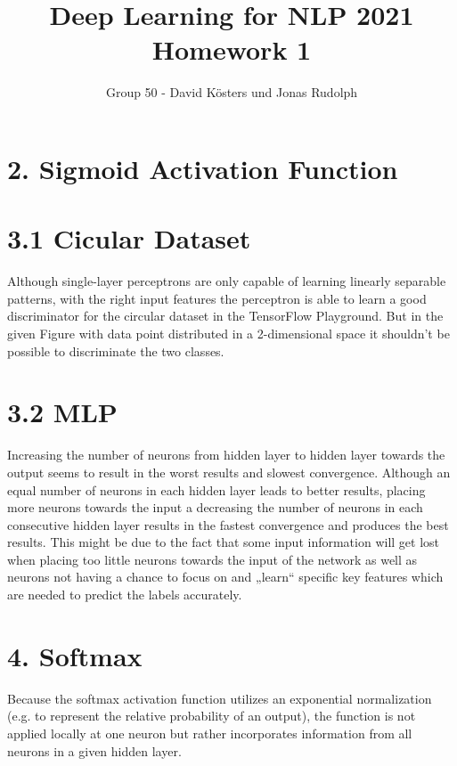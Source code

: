 \documentclass[
	ngerman,
	points=true,%
	]{tudaexercise}
\begin{document}
\title[Übung TUDaExercise]{Deep Learning for NLP 2021
	Homework 1}
\author{Group 50 - David Kösters und Jonas Rudolph}

\maketitle
\section*{2. Sigmoid Activation Function}
\section*{3.1 Cicular Dataset}
Although single-layer perceptrons are only capable of learning linearly separable patterns, with the right input features the perceptron is able to learn a good discriminator for the circular dataset in the TensorFlow Playground. But in the given Figure with data point distributed in a 2-dimensional space it shouldn't be possible to discriminate the two classes.
\section*{3.2 MLP}
Increasing the number of neurons from hidden layer to hidden layer towards the output seems to result in the worst results and slowest convergence. Although an equal number of neurons in each hidden layer leads to better results, placing more neurons towards the input a decreasing the number of neurons in each consecutive hidden layer results in the fastest convergence and produces the best results. This might be due to the fact that some input information will get lost when placing too little neurons towards the input of the network as well as neurons not having a chance to focus on and „learn“ specific key features which are needed to predict the labels accurately.
\section*{4. Softmax}
Because the softmax activation function utilizes an exponential normalization (e.g. to represent the relative probability of an output), the function is not applied locally at one neuron but rather incorporates information from all neurons in a given hidden layer.
\end{document}
